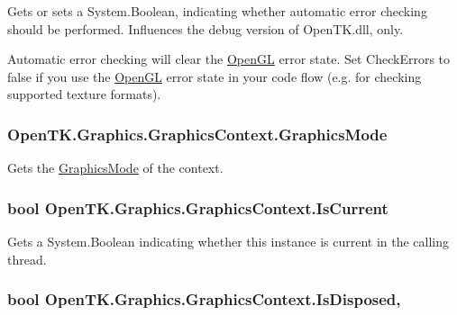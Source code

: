 Gets or sets a System.\-Boolean, indicating whether automatic error checking should be performed. Influences the debug version of Open\-T\-K.\-dll, only. 

Automatic error checking will clear the \hyperlink{namespace_open_t_k_1_1_graphics_1_1_open_g_l}{Open\-G\-L} error state. Set Check\-Errors to false if you use the \hyperlink{namespace_open_t_k_1_1_graphics_1_1_open_g_l}{Open\-G\-L} error state in your code flow (e.\-g. for checking supported texture formats).\hypertarget{class_open_t_k_1_1_graphics_1_1_graphics_context_a5317c00e6a4db8f9b7f20c63791efd01}{
\subsubsection[{Graphics\-Mode}]{ Open\-T\-K.\-Graphics.\-Graphics\-Context.\-Graphics\-Mode\hspace{0.3cm}{\ttfamily [get]}}}\label{class_open_t_k_1_1_graphics_1_1_graphics_context_a5317c00e6a4db8f9b7f20c63791efd01}


Gets the \hyperlink{class_open_t_k_1_1_graphics_1_1_graphics_mode}{Graphics\-Mode} of the context. 

\hypertarget{class_open_t_k_1_1_graphics_1_1_graphics_context_a7cbde7e3ab34ace4c087db96a72f6134}{
\subsubsection[{Is\-Current}]{\setlength{\rightskip}{0pt plus 5cm}bool Open\-T\-K.\-Graphics.\-Graphics\-Context.\-Is\-Current\hspace{0.3cm}{\ttfamily [get]}}}\label{class_open_t_k_1_1_graphics_1_1_graphics_context_a7cbde7e3ab34ace4c087db96a72f6134}


Gets a System.\-Boolean indicating whether this instance is current in the calling thread. 

\hypertarget{class_open_t_k_1_1_graphics_1_1_graphics_context_ade92f0f31700dbb2a64eed7336bca89d}{
\subsubsection[{Is\-Disposed}]{\setlength{\rightskip}{0pt plus 5cm}bool Open\-T\-K.\-Graphics.\-Graphics\-Context.\-Is\-Disposed\hspace{0.3cm}{\ttfamily [get]}, {\ttfamily [set]}}}\label{class_open_t_k_1_1_graphics_1_1_graphics_context_ade92f0f31700dbb2a64eed7336bca89d}


